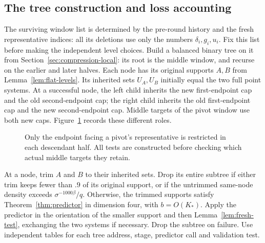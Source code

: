 \subsection{The tree construction and loss accounting}

The surviving window list is determined by the pre-round history and
the fresh representative indices: all its deletions use only the
numbers $\delta_i,g_i,u_i$.  Fix this list before making the independent
level choices.  Build a balanced binary tree on it from
Section~\ref{sec:compression-local}: its root is the middle window,
and recurse on the earlier and later halves.  Each node has its original
supports $A,B$ from Lemma~\ref{lem:flat-levels}.  Its inherited sets
$U_A,U_B$ initially equal the two full point systems.  At a successful
node, the left child inherits the new first-endpoint cap and the old
second-endpoint cap; the right child inherits the old first-endpoint cap
and the new second-endpoint cap.  Middle targets of the pivot window
use both new caps.  Figure~\ref{fig:pivot-tree} records these different
roles.

\begin{figure}[ht]
\centering
{}
\caption{Only the endpoint facing a pivot's representative is restricted
in each descendant half.  All tests are constructed before checking
which actual middle targets they retain.}
\label{fig:pivot-tree}
\end{figure}

At a node, trim $A$ and $B$ to their inherited sets.  Drop its entire subtree
if either trim keeps fewer than $.9$ of its original support, or if the
untrimmed same-node density exceeds $\sigma^{-1000\beta}/q$.
Otherwise, the trimmed supports satisfy Theorem~\ref{thm:predictor} in
dimension four, with $b=O(K_*)$.  Apply the predictor in the orientation
of the smaller support and then Lemma~\ref{lem:fresh-test}, exchanging
the two systems if necessary.  Drop the subtree on failure.  Use
independent tables for each tree address, stage, predictor call and
validation test.

